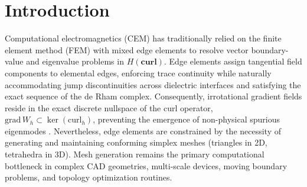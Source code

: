\documentclass[VANCOUVER,Times1COL]{WileyNJD-v5}
\begin{document}

\maketitle




\section{Introduction}
\label{sec:introduction}

Computational electromagnetics (CEM) has traditionally relied on the finite element method (FEM) with mixed edge elements \cite{nedelec1980mixed, monk2003finite, jin2014finite} to resolve vector boundary-value and eigenvalue problems in $H(\mathbf{curl})$. Edge elements assign tangential field components to elemental edges, enforcing trace continuity while naturally accommodating jump discontinuities across dielectric interfaces and satisfying the exact sequence of the de Rham complex. Consequently, irrotational gradient fields reside in the exact discrete nullspace of the curl operator, $\mathrm{grad} \, W_h \subset \ker(\mathrm{curl}_h)$, preventing the emergence of non-physical spurious eigenmodes \cite{bossavit1998computational, boffi2006finite}. Nevertheless, edge elements are constrained by the necessity of generating and maintaining conforming simplex meshes (triangles in 2D, tetrahedra in 3D). Mesh generation remains the primary computational bottleneck in complex CAD geometries, multi-scale devices, moving boundary problems, and topology optimization routines.
\end{document}
